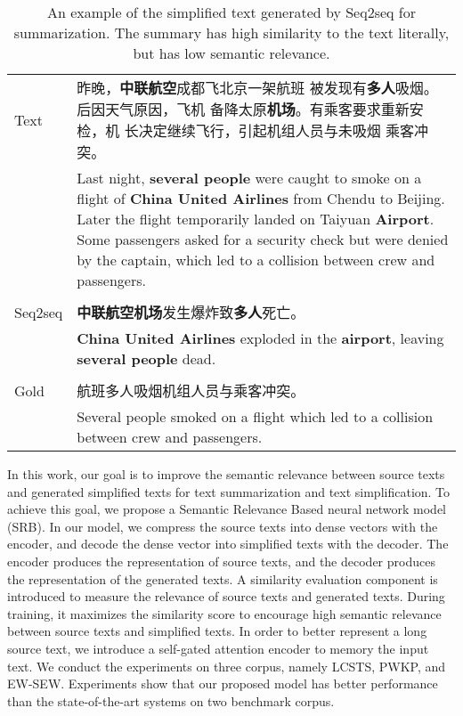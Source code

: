 \documentclass{clv3}
\begin{document}
\begin{CJK*}{UTF8}{gbsn}
\begin{table}[tb]
	\centering
	\caption{An example of the simplified text generated by Seq2seq for summarization. The summary has high similarity to the text literally, but has low semantic relevance.
	}\label{tab1}
	\begin{tabular}{| l p{10.5cm}@{~} |}
		\hline
		Text & 昨晚，\textbf{中联航空}成都飞北京一架航班
		被发现有\textbf{多人}吸烟。后因天气原因，飞机
		备降太原\textbf{机场}。有乘客要求重新安检，机
		长决定继续飞行，引起机组人员与未吸烟
		乘客冲突。\\
		& Last night, \textbf{several people} were caught to smoke on a flight of \textbf{China United Airlines} from 
		Chendu to Beijing. Later the flight temporarily landed on Taiyuan \textbf{Airport}. Some passengers asked for a security check but were denied 
		by the captain, which led to a collision between crew and passengers. \\
		&\\
		Seq2seq & \textbf{中联航空机场}发生爆炸致\textbf{多人}死亡。\\
		& \textbf{China United Airlines} exploded in the \textbf{airport}, 
		leaving \textbf{several people} dead. \\
		&\\
		Gold & 航班多人吸烟机组人员与乘客冲突。 \\ 
		& Several people smoked on a flight which led
		to a collision between crew and passengers. \\
		\hline
	\end{tabular}
	\vspace{-0.1in}
\end{table}

In this work, our goal is to improve the semantic relevance between source texts and generated simplified texts for text summarization and text simplification. To achieve this goal, we propose a Semantic Relevance Based neural network model (SRB). In our model, we compress the source texts into dense vectors with the encoder, and decode the dense vector into simplified texts with the decoder. The encoder produces the representation of source texts, and the decoder produces the representation of the generated texts. A similarity evaluation component is introduced to measure the relevance of source texts and generated texts. During training, it maximizes the similarity score to encourage high semantic relevance between source texts and simplified texts. In order to better represent a long source text, we introduce a self-gated attention encoder to memory the input text. We conduct the experiments on three corpus, namely LCSTS, PWKP, and EW-SEW. Experiments show that our proposed model has better performance than the state-of-the-art systems on two benchmark corpus.


\end{CJK*}
\end{document}
